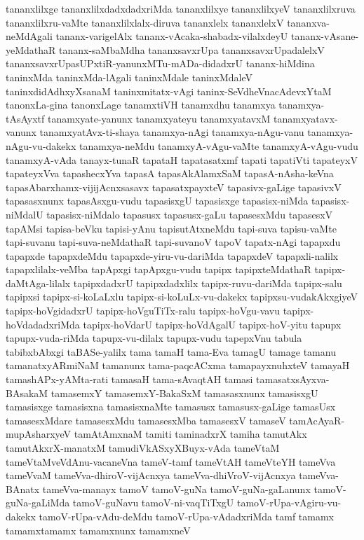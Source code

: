 {tananxlilxge
tananxlilxdadxdadxriMda
tananxlilxye
tananxlilxyeV
tananxlilxruva
tananxlilxru-vaMte
tananxlilxlalx-diruva
tananxlelx
tananxlelxV
tananxva-neMdAgali
tananx-varigelAlx
tananx-vAcaka-shabadx-vilalxdeyU
tananx-vAsane-yeMdathaR
tananx-saMbaMdha
tananxsavxrUpa
tananxsavxrUpadalelxV
tananxsavxrUpasUPxtiR-yanunxMTu-mADa-didadxrU
tananx-hiMdina
taninxMda
taninxMda-lAgali
taninxMdale
taninxMdaleV
taninxdidAdhxyXsanaM
taninxmitatx-vAgi
taninx-SeVdheVnacAdevxYtaM
tanonxLa-gina
tanonxLage
tanamxtiVH
tanamxdhu
tanamxya
tanamxya-tAsAyxtf
tanamxyate-yanunx
tanamxyateyu
tanamxyatavxM
tanamxyatavx-vanunx
tanamxyatAvx-ti-shaya
tanamxya-nAgi
tanamxya-nAgu-vanu
tanamxya-nAgu-vu-dakekx
tanamxya-neMdu
tanamxyA-vAgu-vaMte
tanamxyA-vAgu-vudu
tanamxyA-vAda
tanayx-tunaR
tapataH
tapatasatxmf
tapati
tapatiVti
tapateyxV
tapateyxVva
tapashecxYva
tapasA
tapasAkAlamxSaM
tapasA-nAsha-keVna
tapasAbarxhamx-vijijAcnxsasavx
tapasatxpayxteV
tapasivx-gaLige
tapasivxV
tapasasxnunx
tapasAsxgu-vudu
tapasisxgU
tapasisxge
tapasisx-niMda
tapasisx-niMdalU
tapasisx-niMdalo
tapasusx
tapasusx-gaLu
tapasesxMdu
tapasesxV
tapAMsi
tapisa-beVku
tapisi-yAnu
tapisutAtxneMdu
tapi-suva
tapisu-vaMte
tapi-suvanu
tapi-suva-neMdathaR
tapi-suvanoV
tapoV
tapatx-nAgi
tapapxdu
tapapxde
tapapxdeMdu
tapapxde-yiru-vu-dariMda
tapapxdeV
tapapxli-nalilx
tapapxlilalx-veMba
tapApxgi
tapApxgu-vudu
tapipx
tapipxteMdathaR
tapipx-daMtAga-lilalx
tapipxdadxrU
tapipxdadxlilx
tapipx-ruvu-dariMda
tapipx-salu
tapipxsi
tapipx-si-koLaLxlu
tapipx-si-koLuLx-vu-dakekx
tapipxsu-vudakAkxgiyeV
tapipx-hoVgidadxrU
tapipx-hoVguTiTx-ralu
tapipx-hoVgu-vavu
tapipx-hoVdadadxriMda
tapipx-hoVdarU
tapipx-hoVdAgalU
tapipx-hoV-yitu
tapupx
tapupx-vuda-riMda
tapupx-vu-dilalx
tapupx-vudu
tapepxVnu
tabula
tabibxbAbxgi
taBASe-yalilx
tama
tamaH
tama-Eva
tamagU
tamage
tamanu
tamanatxyARmiNaM
tamanunx
tama-paqcACxma
tamapayxnuhxteV
tamayaH
tamashAPx-yAMta-rati
tamasaH
tama-sAvaqtAH
tamasi
tamasatxsAyxva-BAsakaM
tamasemxY
tamasemxY-BakaSxM
tamasasxnunx
tamasisxgU
tamasisxge
tamasisxna
tamasisxnaMte
tamasusx
tamasusx-gaLige
tamasUsx
tamasesxMdare
tamasesxMdu
tamasesxMba
tamasesxV
tamaseV
tamAcAyaR-mupAsharxyeV
tamAtAmxnaM
tamiti
taminadxrX
tamiha
tamutAkx
tamutAkxrX-manatxM
tamudiVkASxyXBuyx-vAda
tameVtaM
tameVtaMveVdAnu-vacaneVna
tameV-tamf
tameVtAH
tameVteYH
tameVva
tameVvaM
tameVva-dhiroV-vijAcnxya
tameVva-dhiVroV-vijAcnxya
tameVva-BAnatx
tameVva-manayx
tamoV
tamoV-guNa
tamoV-guNa-gaLanunx
tamoV-guNa-gaLiMda
tamoV-guNavu
tamoV-ni-vaqTiTxgU
tamoV-rUpa-vAgiru-vu-dakekx
tamoV-rUpa-vAdu-deMdu
tamoV-rUpa-vAdadxriMda
tamf
tamamx
tamamxtamamx
tamamxnunx
tamamxneV
}
